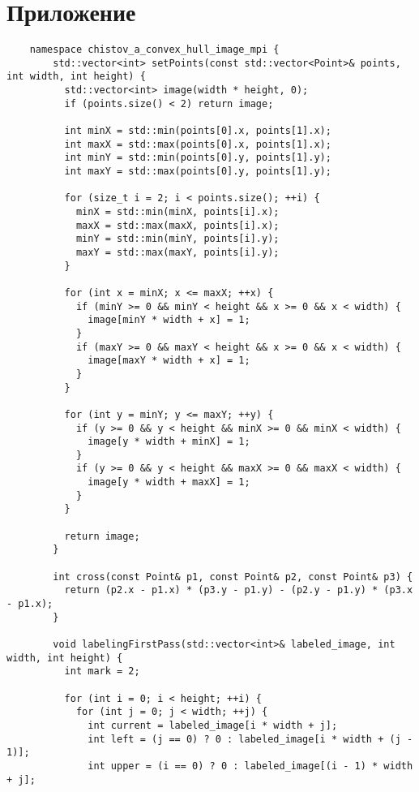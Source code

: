 \documentclass{report}
\begin{document}
\section*{Приложение}
\begin{lstlisting}
    namespace chistov_a_convex_hull_image_mpi {
        std::vector<int> setPoints(const std::vector<Point>& points, int width, int height) {
          std::vector<int> image(width * height, 0);
          if (points.size() < 2) return image;
        
          int minX = std::min(points[0].x, points[1].x);
          int maxX = std::max(points[0].x, points[1].x);
          int minY = std::min(points[0].y, points[1].y);
          int maxY = std::max(points[0].y, points[1].y);
        
          for (size_t i = 2; i < points.size(); ++i) {
            minX = std::min(minX, points[i].x);
            maxX = std::max(maxX, points[i].x);
            minY = std::min(minY, points[i].y);
            maxY = std::max(maxY, points[i].y);
          }
        
          for (int x = minX; x <= maxX; ++x) {
            if (minY >= 0 && minY < height && x >= 0 && x < width) {
              image[minY * width + x] = 1;
            }
            if (maxY >= 0 && maxY < height && x >= 0 && x < width) {
              image[maxY * width + x] = 1;
            }
          }
        
          for (int y = minY; y <= maxY; ++y) {
            if (y >= 0 && y < height && minX >= 0 && minX < width) {
              image[y * width + minX] = 1;
            }
            if (y >= 0 && y < height && maxX >= 0 && maxX < width) {
              image[y * width + maxX] = 1;
            }
          }
        
          return image;
        }
        
        int cross(const Point& p1, const Point& p2, const Point& p3) {
          return (p2.x - p1.x) * (p3.y - p1.y) - (p2.y - p1.y) * (p3.x - p1.x);
        }
        
        void labelingFirstPass(std::vector<int>& labeled_image, int width, int height) {
          int mark = 2;
        
          for (int i = 0; i < height; ++i) {
            for (int j = 0; j < width; ++j) {
              int current = labeled_image[i * width + j];
              int left = (j == 0) ? 0 : labeled_image[i * width + (j - 1)];
              int upper = (i == 0) ? 0 : labeled_image[(i - 1) * width + j];
        

\end{lstlisting}
\end{document}
